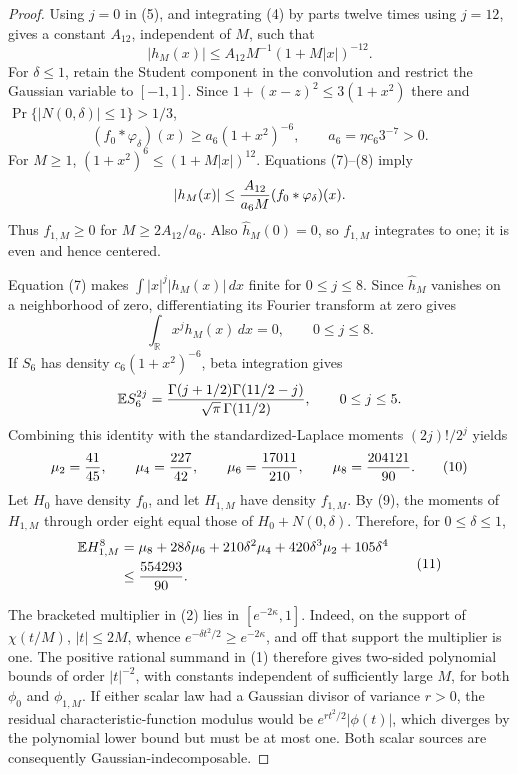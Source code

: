 \documentclass{article}
\begin{document}
\begin{proof}
Using \(j=0\) in (5), and integrating (4) by parts twelve times using \(j=12\), gives a constant \(A_{12}\), independent of \(M\), such that
\[
 |h_M(x)|\le A_{12}M^{-1}(1+M|x|)^{-12}. \tag{7}
\]
For \(\delta\le1\), retain the Student component in the convolution and restrict the Gaussian variable to \([-1,1]\).  Since \(1+(x-z)^2\le3(1+x^2)\) there and \(\Pr\{|N(0,\delta)|\le1\}>1/3\),
\[
 (f_0*\varphi_\delta)(x)
 \ge a_6(1+x^2)^{-6},
 \qquad a_6=\eta c_6 3^{-7}>0. \tag{8}
\]
For \(M\ge1\), \((1+x^2)^6\le(1+M|x|)^{12}\).  Equations (7)--(8) imply
\[
 |h_M(x)|\le {A_{12}\over a_6M}(f_0*\varphi_\delta)(x).
\]
Thus \(f_{1,M}\ge0\) for \(M\ge2A_{12}/a_6\).  Also \(\widehat h_M(0)=0\), so \(f_{1,M}\) integrates to one; it is even and hence centered.

Equation (7) makes \(\int |x|^j|h_M(x)|\,dx\) finite for \(0\le j\le8\).  Since \(\widehat h_M\) vanishes on a neighborhood of zero, differentiating its Fourier transform at zero gives
\[
 \int_{\mathbb R}x^jh_M(x)\,dx=0,
 \qquad 0\le j\le8. \tag{9}
\]
If \(S_6\) has density \(c_6(1+x^2)^{-6}\), beta integration gives
\[
 \mathbb ES_6^{2j}
 ={\Gamma(j+1/2)\Gamma(11/2-j)\over
   \sqrt\pi\,\Gamma(11/2)},
 \qquad0\le j\le5.
\]
Combining this identity with the standardized-Laplace moments \((2j)!/2^j\) yields
\[
 \mu_2={41\over45},\qquad
 \mu_4={227\over42},\qquad
 \mu_6={17011\over210},\qquad
 \mu_8={204121\over90}. \tag{10}
\]
Let \(H_0\) have density \(f_0\), and let \(H_{1,M}\) have density \(f_{1,M}\).  By (9), the moments of \(H_{1,M}\) through order eight equal those of \(H_0+N(0,\delta)\).  Therefore, for \(0\le\delta\le1\),
\[
 \begin{aligned}
 \mathbb EH_{1,M}^8
 &=\mu_8+28\delta\mu_6+210\delta^2\mu_4
   +420\delta^3\mu_2+105\delta^4\\
 &\le {554293\over90}. 
 \end{aligned} \tag{11}
\]

The bracketed multiplier in (2) lies in \([e^{-2\kappa},1]\).  Indeed, on the support of \(\chi(t/M)\), \(|t|\le2M\), whence \(e^{-\delta t^2/2}\ge e^{-2\kappa}\), and off that support the multiplier is one.  The positive rational summand in (1) therefore gives two-sided polynomial bounds of order \(|t|^{-2}\), with constants independent of sufficiently large \(M\), for both \(\phi_0\) and \(\phi_{1,M}\).  If either scalar law had a Gaussian divisor of variance \(r>0\), the residual characteristic-function modulus would be \(e^{rt^2/2}|\phi(t)|\), which diverges by the polynomial lower bound but must be at most one.  Both scalar sources are consequently Gaussian-indecomposable.


\end{proof}
\end{document}
